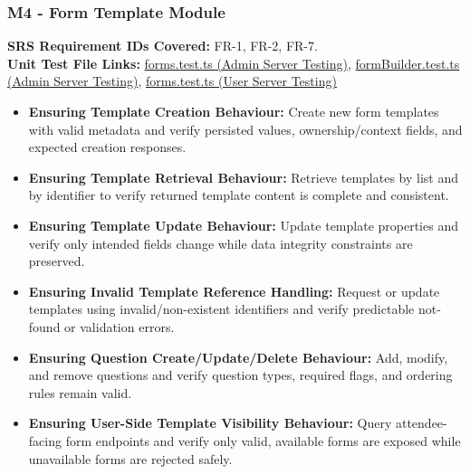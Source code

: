 \documentclass[12pt, titlepage]{article}
\begin{document}
\subsubsection{M4 - Form Template Module}
\textbf{SRS Requirement IDs Covered:} FR-1, FR-2, FR-7.
\\
\textbf{Unit Test File Links:} \href{https://github.com/VirochaanRG/MES-Event-Management-System/blob/main/test/Server%20API%20Testing/Admin%20Server%20Testing/forms.test.ts}{forms.test.ts (Admin Server Testing)}, \href{https://github.com/VirochaanRG/MES-Event-Management-System/blob/main/test/Server%20API%20Testing/Admin%20Server%20Testing/formBuilder.test.ts}{formBuilder.test.ts (Admin Server Testing)}, \href{https://github.com/VirochaanRG/MES-Event-Management-System/blob/main/test/Server%20API%20Testing/User%20Server%20Testing/forms.test.ts}{forms.test.ts (User Server Testing)}
\begin{itemize}
  \item \textbf{Ensuring Template Creation Behaviour:} Create new form templates with valid metadata and verify persisted values, ownership/context fields, and expected creation responses.
  \item \textbf{Ensuring Template Retrieval Behaviour:} Retrieve templates by list and by identifier to verify returned template content is complete and consistent.
  \item \textbf{Ensuring Template Update Behaviour:} Update template properties and verify only intended fields change while data integrity constraints are preserved.
  \item \textbf{Ensuring Invalid Template Reference Handling:} Request or update templates using invalid/non-existent identifiers and verify predictable not-found or validation errors.
  \item \textbf{Ensuring Question Create/Update/Delete Behaviour:} Add, modify, and remove questions and verify question types, required flags, and ordering rules remain valid.
  \item \textbf{Ensuring User-Side Template Visibility Behaviour:} Query attendee-facing form endpoints and verify only valid, available forms are exposed while unavailable forms are rejected safely.
\end{itemize}
\end{document}
